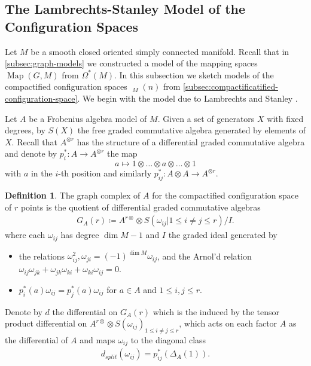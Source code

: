 \documentclass{scrartcl}
\theoremstyle{plain}
\theoremstyle{definition}
\newtheorem{definition}[theorem]{Definition}
\newcommand{\defeq}{\coloneqq}
\DeclareMathOperator{\Map}{Map}
\DeclareMathOperator{\cConf}{\overline{Conf}}
\begin{document}
\subsection{The Lambrechts-Stanley Model of the Configuration Spaces}\label{subsec:cfg-models}
Let $M$ be a smooth closed oriented simply connected manifold. Recall that in \cref{subsec:graph-models} we constructed a model of the mapping spaces $\Map(G, M)$ from $\Omega^*(M)$. In this subsection we sketch models of the compactified configuration spaces $\cConf_M(n)$ from \cref{subsec:compactificatified-configuration-space}. We begin with the model due to Lambrechts and Stanley \cite{lambrechts2008remarkable}. 

Let $A$ be a Frobenius algebra model of $M$. Given a set of generators $X$ with fixed degrees, by $S(X)$ the free graded commutative algebra generated by elements of $X$. Recall that $A^{\otimes r}$ has the structure of a differential graded commutative algebra and denote by $p_{i}^* \colon A \to A^{\otimes r}$ the map $$a\mapsto 1\otimes\dots\otimes a\otimes \dots\otimes 1$$ with $a$ in the $i$-th position and similarly $p_{ij}^*\colon A\otimes A\to A^{\otimes r}$.

\begin{definition}
    The graph complex of $A$ for the compactified configuration space of $r$ points is the quotient of differential graded commutative algebras
\begin{align*}
    G_A(r) \defeq A^{r\otimes} \otimes S(\omega_{ij} | {1 \leq i\neq j\leq r}) / I.
\end{align*}
where each $\omega_{ij}$ has degree $\dim M-1$ and $I$ the graded ideal generated by 
\begin{itemize}
    \item the relations $\omega_{ij}^2, \omega_{ji} = (-1)^{\dim M} \omega_{ij}$, and the Arnol'd relation $\omega_{ij}\omega_{jk} + \omega_{jk}\omega_{ki} + \omega_{ki}\omega_{ij} = 0$.
    \item $p_i^*(a)\omega_{ij} = p_j^*(a)\omega_{ij}$ for $a\in A$ and $1\leq i, j \leq r$. 
\end{itemize}
\end{definition}

Denote by $d$ the differential on $G_A(r)$ which is the induced by the tensor product differential on $A^{r\otimes} \otimes S(\omega_{ij})_{1 \leq i\neq j\leq r}$, which acts on each factor $A$ as the differential of $A$ and maps $\omega_{ij}$ to the diagonal class 
\begin{align*}
    d_{split}(\omega_{ij}) = p_{ij}^*(\Delta_A(1)).
\end{align*}
\end{document}
